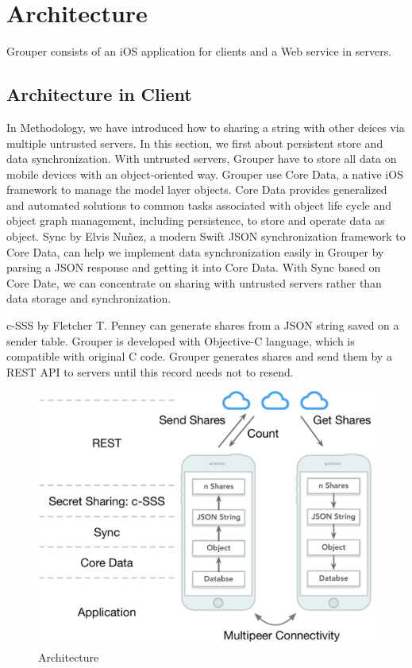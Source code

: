 \documentclass[twocolumn,10pt]{article}
\begin{document}
\section{Architecture}
Grouper consists of an iOS application for clients and a Web service in servers.

\subsection{Architecture in Client}
In Methodology, we have introduced how to sharing a string with other deices via multiple untrusted servers. In this section, we first about persistent store and data synchronization. With untrusted servers, Grouper have to store all data on mobile devices with an object-oriented way. Grouper use Core Data\cite{coredata}, a native iOS framework to manage the model layer objects. Core Data provides generalized and automated solutions to common tasks associated with object life cycle and object graph management, including persistence, to store and operate data as object. Sync\cite{sync} by Elvis Nuñez, a modern Swift JSON synchronization framework to Core Data, can help we implement data synchronization easily in Grouper by parsing a JSON response and getting it into Core Data. With Sync based on Core Date, we can concentrate on sharing with untrusted servers rather than data storage and synchronization.

c-SSS by Fletcher T. Penney can generate shares from a JSON string saved on a sender table. Grouper is developed with Objective-C language, which is compatible with original C code. Grouper generates shares and send them by a REST API to servers until this record needs not to resend.

\begin{figure}[t]
\centering
\includegraphics[scale=0.4]{architecture}
\caption{Architecture}
\end{figure}
\end{document}
